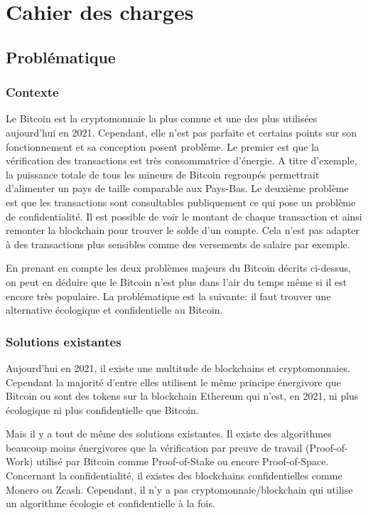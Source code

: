 \chapter{Cahier des charges}

\section*{Problématique}

\subsection*{Contexte}

Le Bitcoin est la cryptomonnaie la plus connue et une des plus utilisées aujourd'hui en 2021. Cependant, elle n'est pas parfaite et certains points sur son fonctionnement et sa conception posent problème. Le premier est que la vérification des transactions est très consommatrice d'énergie. A titre d'exemple, la puissance totale de tous les mineurs de Bitcoin regroupés permettrait d'alimenter un pays de taille comparable aux Pays-Bas\cite{BTC_cons}. Le deuxième problème est que les transactions sont consultables publiquement ce qui pose un problème de confidentialité. Il est possible de voir le montant de chaque transaction et ainsi remonter la blockchain pour trouver le solde d'un compte. Cela n'est pas adapter à des transactions plus sensibles comme des versements de salaire par exemple.

En prenant en compte les deux problèmes majeurs du Bitcoin décrits ci-dessus, on peut en déduire que le Bitcoin n'est plus dans l'air du temps même si il est encore très populaire. La problématique est la suivante: il faut trouver une alternative écologique et confidentielle au Bitcoin.

\subsection*{Solutions existantes}

Aujourd'hui en 2021, il existe une multitude de blockchains et cryptomonnaies. Cependant la majorité d'entre elles utilisent le même principe énergivore que Bitcoin ou sont des tokens sur la blockchain Ethereum qui n'est, en 2021, ni plus écologique ni plus confidentielle que Bitcoin.

Mais il y a tout de même des solutions existantes. Il existe des algorithmes beaucoup moins énergivores que la vérification par preuve de travail (Proof-of-Work) utilisé par Bitcoin comme Proof-of-Stake ou encore Proof-of-Space. Concernant la confidentialité, il existes des blockchains confidentielles comme Monero ou Zcash. Cependant, il n'y a pas cryptomonnaie/blockchain qui utilise un algorithme écologie et confidentielle à la fois.

